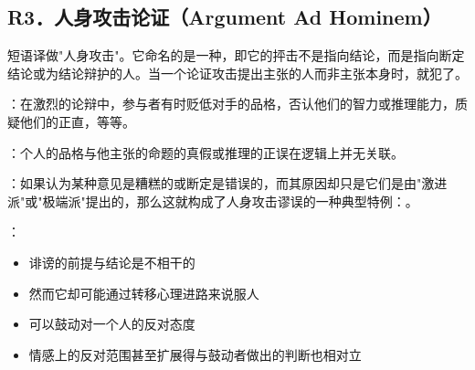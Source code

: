 \subsection{R3．人身攻击论证（Argument Ad Hominem）}

\begin{theorembox}[title=人身攻击论证的定义]
短语译做"人身攻击"。它命名的是一种，即它的抨击不是指向结论，而是指向断定结论或为结论辩护的人。当一个论证攻击提出主张的人而非主张本身时，就犯了。
\end{theorembox}

\begin{theorembox}[title=A. 诽谤型人身攻击]
：在激烈的论辩中，参与者有时贬低对手的品格，否认他们的智力或推理能力，质疑他们的正直，等等。

：个人的品格与他主张的命题的真假或推理的正误在逻辑上并无关联。

：如果认为某种意见是糟糕的或断定是错误的，而其原因却只是它们是由"激进派"或"极端派"提出的，那么这就构成了人身攻击谬误的一种典型特例：。

：
\begin{itemize}
  \item 诽谤的前提与结论是不相干的
  \item 然而它却可能通过转移心理进路来说服人
  \item 可以鼓动对一个人的反对态度
  \item 情感上的反对范围甚至扩展得与鼓动者做出的判断也相对立
\end{itemize}
\end{theorembox}

